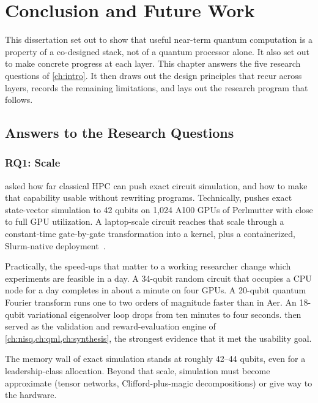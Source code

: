 \chapter{Conclusion and Future Work}\label{ch:conclusion}


This dissertation set out to show that useful near-term quantum computation is a property of a co-designed stack, not of a quantum processor alone. It also set out to make concrete progress at each layer. This chapter answers the five research questions of \cref{ch:intro}. It then draws out the design principles that recur across layers, records the remaining limitations, and lays out the research program that follows.

\section{Answers to the Research Questions}\label{sec:conclusion:answers}

\subsection{RQ1: Scale}\label{sec:conclusion:rq1}

 asked how far classical HPC can push exact circuit simulation, and how to make that capability usable without rewriting programs. Technically, \qgear{} pushes exact state-vector simulation to 42 qubits on 1,024 A100 GPUs of Perlmutter with close to full GPU utilization. A laptop-scale \qiskit{} circuit reaches that scale through a constant-time gate-by-gate transformation into a \cudaq{} kernel, plus a containerized, Slurm-native deployment~\cite{guo2025qgear}.

Practically, the speed-ups that matter to a working researcher change which experiments are feasible in a day. A 34-qubit random circuit that occupies a CPU node for a day completes in about a minute on four GPUs. A 20-qubit quantum Fourier transform runs one to two orders of magnitude faster than in \qiskit{} Aer. An 18-qubit variational eigensolver loop drops from ten minutes to four seconds. \qgear{} then served as the validation and reward-evaluation engine of \cref{ch:nisq,ch:qml,ch:synthesis}, the strongest evidence that it met the usability goal.

The memory wall of exact simulation stands at roughly 42--44 qubits, even for a leadership-class allocation. Beyond that scale, simulation must become approximate (tensor networks, Clifford-plus-magic decompositions) or give way to the hardware.

